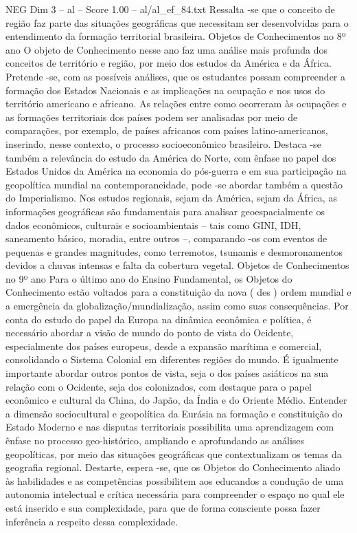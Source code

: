 \begin{textsample}{NEG Dim 3 – al – Score 1.00 – al/al\_ef\_84.txt}
Ressalta -se que o conceito de região faz parte das situações geográficas que necessitam ser desenvolvidas para o entendimento da formação territorial brasileira.
Objetos de Conhecimentos no 8º ano O objeto de Conhecimento nesse ano faz uma análise mais profunda dos conceitos de território e região, por meio dos estudos da América e da África.
Pretende -se, com as possíveis análises, que os estudantes possam compreender a formação dos Estados Nacionais e as implicações na ocupação e nos usos do território americano e africano.
As relações entre como ocorreram às ocupações e as formações territoriais dos países podem ser analisadas por meio de comparações, por exemplo, de países africanos com países latino-americanos, inserindo, nesse contexto, o processo socioeconômico brasileiro.
Destaca -se também a relevância do estudo da América do Norte, com ênfase no papel dos Estados Unidos da América na economia do pós-guerra e em sua participação na geopolítica mundial na contemporaneidade, pode -se abordar também a questão do Imperialismo.
Nos estudos regionais, sejam da América, sejam da África, as informações geográficas são fundamentais para analisar geoespacialmente os dados econômicos, culturais e socioambientais – tais como GINI, IDH, saneamento básico, moradia, entre outros –, comparando -os com eventos de pequenas e grandes magnitudes, como terremotos, tsunamis e desmoronamentos devidos a chuvas intensas e falta da cobertura vegetal.
Objetos de Conhecimentos no 9º ano Para o último ano do Ensino Fundamental, os Objetos do Conhecimento estão voltados para a constituição da nova ( des ) ordem mundial e a emergência da globalização/mundialização, assim como suas consequências.
Por conta do estudo do papel da Europa na dinâmica econômica e política, é necessário abordar a visão de mundo do ponto de vista do Ocidente, especialmente dos países europeus, desde a expansão marítima e comercial, consolidando o Sistema Colonial em diferentes regiões do mundo.
É igualmente importante abordar outros pontos de vista, seja o dos países asiáticos na sua relação com o Ocidente, seja dos colonizados, com destaque para o papel econômico e cultural da China, do Japão, da Índia e do Oriente Médio.
Entender a dimensão sociocultural e geopolítica da Eurásia na formação e constituição do Estado Moderno e nas disputas territoriais possibilita uma aprendizagem com ênfase no processo geo-histórico, ampliando e aprofundando as análises geopolíticas, por meio das situações geográficas que contextualizam os temas da geografia regional.
Destarte, espera -se, que os Objetos do Conhecimento aliado às habilidades e as competências possibilitem aos educandos a condução de uma autonomia intelectual e crítica necessária para compreender o espaço no qual ele está inserido e sua complexidade, para que de forma consciente possa fazer inferência a respeito dessa complexidade.

\end{textsample}
